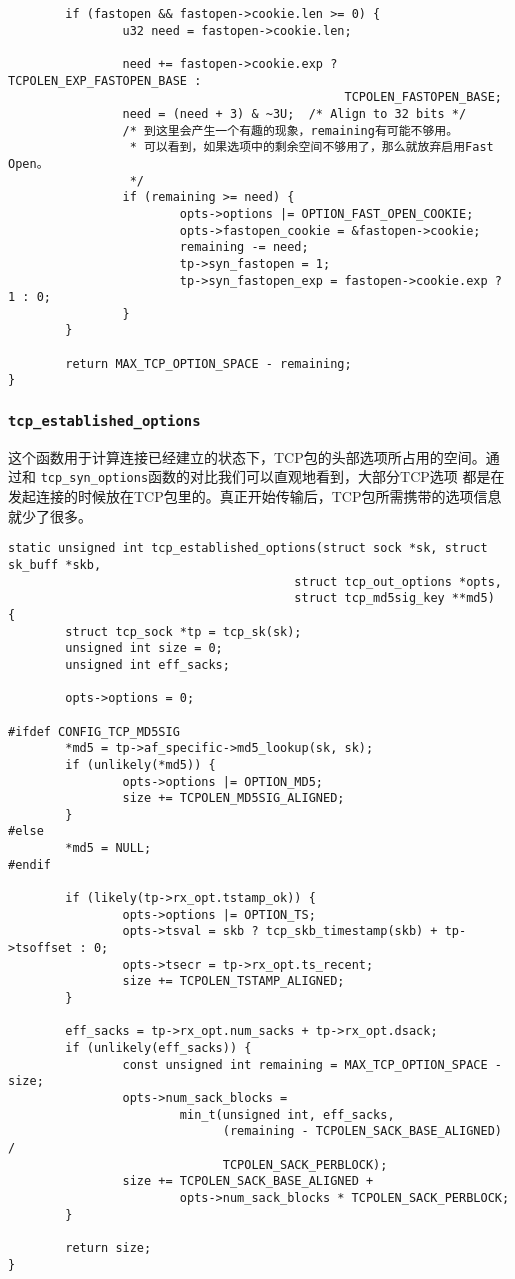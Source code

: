 \begin{verbatim}
        if (fastopen && fastopen->cookie.len >= 0) {
                u32 need = fastopen->cookie.len;

                need += fastopen->cookie.exp ? TCPOLEN_EXP_FASTOPEN_BASE :
                                               TCPOLEN_FASTOPEN_BASE;
                need = (need + 3) & ~3U;  /* Align to 32 bits */
                /* 到这里会产生一个有趣的现象，remaining有可能不够用。
                 * 可以看到，如果选项中的剩余空间不够用了，那么就放弃启用Fast Open。
                 */
                if (remaining >= need) {
                        opts->options |= OPTION_FAST_OPEN_COOKIE;
                        opts->fastopen_cookie = &fastopen->cookie;
                        remaining -= need;
                        tp->syn_fastopen = 1;
                        tp->syn_fastopen_exp = fastopen->cookie.exp ? 1 : 0;
                }
        }

        return MAX_TCP_OPTION_SPACE - remaining;
}
\end{verbatim}

\subsubsection{\texttt{tcp_established_options}}
这个函数用于计算连接已经建立的状态下，TCP包的头部选项所占用的空间。通过和
\texttt{tcp_syn_options}函数的对比我们可以直观地看到，大部分TCP选项
都是在发起连接的时候放在TCP包里的。真正开始传输后，TCP包所需携带的选项信息
就少了很多。
\begin{verbatim}
static unsigned int tcp_established_options(struct sock *sk, struct sk_buff *skb,
                                        struct tcp_out_options *opts,
                                        struct tcp_md5sig_key **md5)
{       
        struct tcp_sock *tp = tcp_sk(sk);
        unsigned int size = 0;
        unsigned int eff_sacks;
        
        opts->options = 0;

#ifdef CONFIG_TCP_MD5SIG
        *md5 = tp->af_specific->md5_lookup(sk, sk);
        if (unlikely(*md5)) { 
                opts->options |= OPTION_MD5;
                size += TCPOLEN_MD5SIG_ALIGNED;
        }
#else   
        *md5 = NULL;
#endif
        
        if (likely(tp->rx_opt.tstamp_ok)) {
                opts->options |= OPTION_TS;
                opts->tsval = skb ? tcp_skb_timestamp(skb) + tp->tsoffset : 0;
                opts->tsecr = tp->rx_opt.ts_recent;
                size += TCPOLEN_TSTAMP_ALIGNED;
        }
        
        eff_sacks = tp->rx_opt.num_sacks + tp->rx_opt.dsack;
        if (unlikely(eff_sacks)) { 
                const unsigned int remaining = MAX_TCP_OPTION_SPACE - size;
                opts->num_sack_blocks =
                        min_t(unsigned int, eff_sacks,
                              (remaining - TCPOLEN_SACK_BASE_ALIGNED) /
                              TCPOLEN_SACK_PERBLOCK);
                size += TCPOLEN_SACK_BASE_ALIGNED +
                        opts->num_sack_blocks * TCPOLEN_SACK_PERBLOCK;
        }
        
        return size;
}
\end{verbatim}

